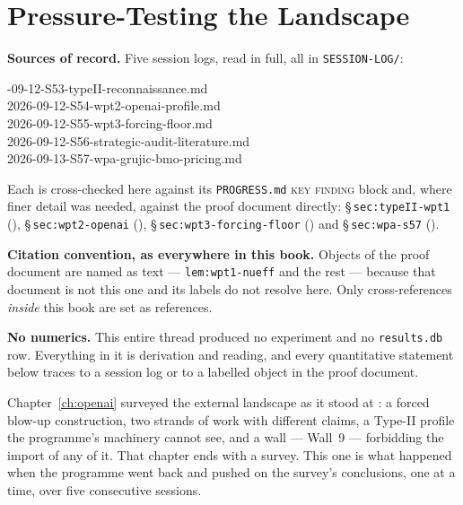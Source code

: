 \chapter{Pressure-Testing the Landscape}
\label{ch:pressure-testing}

\begin{record}
\textbf{Sources of record.} Five session logs, read in full, all in
\texttt{SESSION-LOG/}:

\smallskip
{\raggedright{}-09-12-S53-typeII-reconnaissance.md\\
2026-09-12-S54-wpt2-openai-profile.md\\
2026-09-12-S55-wpt3-forcing-floor.md\\
2026-09-12-S56-strategic-audit-literature.md\\
2026-09-13-S57-wpa-grujic-bmo-pricing.md\par}

\smallskip
Each is cross-checked here against its
\texttt{PROGRESS.md} \textsc{key finding} block
and, where finer detail was needed, against the proof document directly:
\S\,\texttt{sec:typeII-wpt1} (), \S\,\texttt{sec:wpt2-openai}
(), \S\,\texttt{sec:wpt3-forcing-floor} () and
\S\,\texttt{sec:wpa-s57} ().

\smallskip
\textbf{Citation convention, as everywhere in this book.} Objects of the proof
document are named as text --- \texttt{lem:wpt1-nueff} and the rest --- because
that document is not this one and its labels do not resolve here. Only
cross-references \emph{inside} this book are set as references.

\smallskip
\textbf{No numerics.} This entire thread produced no experiment and no
\texttt{results.db} row. Everything in it is derivation and reading, and every
quantitative statement below traces to a session log or to a labelled object in
the proof document.
\end{record}

Chapter~\ref{ch:openai} surveyed the external landscape as it stood at :
a forced blow-up construction, two strands of work with different claims, a
Type-II profile the programme's machinery cannot see, and a wall --- Wall~9 ---
forbidding the import of any of it. That chapter ends with a survey. This one
is what happened when the programme went back and pushed on the survey's
conclusions, one at a time, over five consecutive sessions.

